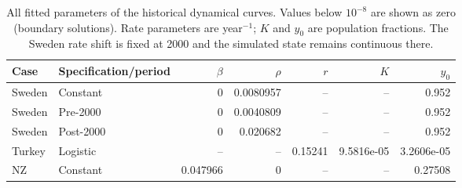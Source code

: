 \begin{table}[!htbp]\centering\small
\caption{All fitted parameters of the historical dynamical curves. Values below $10^{-8}$ are shown as zero (boundary solutions). Rate parameters are year$^{-1}$; $K$ and $y_0$ are population fractions. The Sweden rate shift is fixed at 2000 and the simulated state remains continuous there.}\label{tab:historical_params}
\begin{tabular}{llrrrrr}\toprule Case & Specification/period & $\beta$ & $\rho$ & $r$ & $K$ & $y_0$\\\midrule
Sweden & Constant & 0 & 0.0080957 & -- & -- & 0.952\\
Sweden & Pre-2000 & 0 & 0.0040809 & -- & -- & 0.952\\
Sweden & Post-2000 & 0 & 0.020682 & -- & -- & 0.952\\
Turkey & Logistic & -- & -- & 0.15241 & 9.5816e-05 & 3.2606e-05\\
NZ & Constant & 0.047966 & 0 & -- & -- & 0.27508\\
\bottomrule\end{tabular}\end{table}
